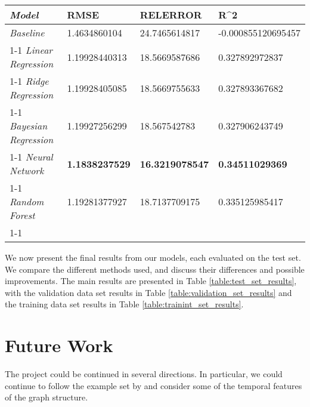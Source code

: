 \documentclass[letterpaper, 10 pt, conference]{ieeeconf}  %
\begin{document}
{\renewcommand{\arraystretch}{2}%
\begin{table*}[t]
\centering
\caption{Supervised Training Results on Test Set}
\label{table:test_set_results}
\begin{tabular}{|l|lll}
\hline
\textit{\textbf{Model}}      & \multicolumn{1}{l|}{\textbf{RMSE}} & \multicolumn{1}{l|}{\textbf{RELERROR}} & \multicolumn{1}{l|}{\textbf{R\textasciicircum 2}} \\ \hline
\textit{Baseline}            & 1.4634860104                       & 24.7465614817                          & -0.000855120695457                                \\ \cline{1-1}
\textit{Linear Regression}   & 1.19928440313                      & 18.5669587686                          & 0.327892972837                                    \\ \cline{1-1}
\textit{Ridge Regression}    & 1.19928405085                      & 18.5669755633                          & 0.327893367682                                    \\ \cline{1-1}
\textit{Bayesian Regression} & 1.19927256299                      & 18.567542783                           & 0.327906243749                                    \\ \cline{1-1}
\textit{Neural Network}      & \textbf{1.1838237529}              & \textbf{16.3219078547}                 & \textbf{0.34511029369}                            \\ \cline{1-1}
\textit{Random Forest}       & 1.19281377927                      & 18.7137709175                          & 0.335125985417                                    \\ \cline{1-1}
\end{tabular}
\end{table*}
}

We now present the final results from our models, each evaluated on the test set. We compare the different methods used, and discuss their differences and possible improvements. The main results are presented in Table \ref{table:test_set_results}, with the validation data set results in Table \ref{table:validation_set_results} and the training data set results in Table \ref{table:trainint_set_results}. 



\section{Future Work}
The project could be continued in several directions. In particular, we could continue to follow the example set by \cite{PintrestProject} and consider some of the temporal features of the graph structure. 
\end{document}
